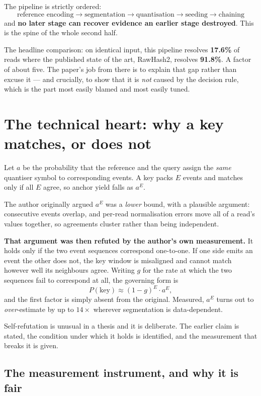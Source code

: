 \documentclass[11pt,a4paper]{article}
\begin{document}
The pipeline is strictly ordered:
\[
\text{reference encoding} \to \text{segmentation} \to \text{quantisation} \to
\text{seeding} \to \text{chaining}
\]
and \textbf{no later stage can recover evidence an earlier stage destroyed}. This is the
spine of the whole second half.

The headline comparison: on identical input, this pipeline resolves \textbf{17.6\%} of reads
where the published state of the art, RawHash2, resolves \textbf{91.8\%}. A factor of about
five. The paper's job from there is to explain that gap rather than excuse it --- and
crucially, to show that it is \emph{not} caused by the decision rule, which is the part most
easily blamed and most easily tuned.

\section{The technical heart: why a key matches, or does not}

Let $a$ be the probability that the reference and the query assign the \emph{same} quantiser
symbol to corresponding events. A key packs $E$ events and matches only if all $E$ agree, so
anchor yield falls as $a^{E}$.

The author originally argued $a^{E}$ was a \emph{lower} bound, with a plausible argument:
consecutive events overlap, and per-read normalisation errors move all of a read's values
together, so agreements cluster rather than being independent.

\textbf{That argument was then refuted by the author's own measurement.} It holds only if the
two event sequences correspond one-to-one. If one side emits an event the other does not, the
key window is misaligned and cannot match however well its neighbours agree. Writing $g$ for
the rate at which the two sequences fail to correspond at all, the governing form is
\[
P(\text{key}) \approx (1-g)^{E} \cdot a^{E},
\]
and the first factor is simply absent from the original. Measured, $a^{E}$ turns out to
\emph{over}-estimate by up to $14\times$ wherever segmentation is data-dependent.

Self-refutation is unusual in a thesis and it is deliberate. The earlier claim is stated, the
condition under which it holds is identified, and the measurement that breaks it is given.

\subsection*{The measurement instrument, and why it is fair}
\end{document}
